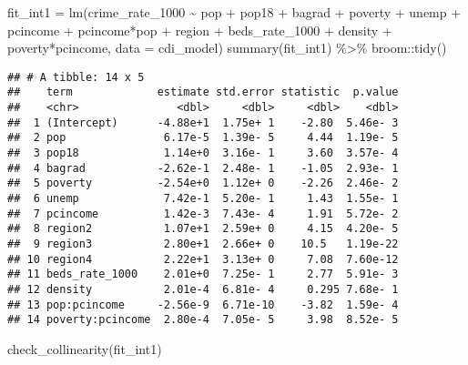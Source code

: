 \documentclass[
  11pt,
]{article}
\newenvironment{Shaded}{\begin{snugshade}}{\end{snugshade}}
\newcommand{\AttributeTok}[1]{\textcolor[rgb]{0.77,0.63,0.00}{#1}}
\newcommand{\FunctionTok}[1]{\textcolor[rgb]{0.00,0.00,0.00}{#1}}
\newcommand{\NormalTok}[1]{#1}
\newcommand{\OtherTok}[1]{\textcolor[rgb]{0.56,0.35,0.01}{#1}}
\newcommand{\SpecialCharTok}[1]{\textcolor[rgb]{0.00,0.00,0.00}{#1}}
\begin{document}
\begin{Shaded}
\begin{Highlighting}[]
\NormalTok{fit\_int1 }\OtherTok{=} \FunctionTok{lm}\NormalTok{(crime\_rate\_1000 }\SpecialCharTok{\textasciitilde{}}  
\NormalTok{                   pop }\SpecialCharTok{+}\NormalTok{ pop18 }\SpecialCharTok{+}\NormalTok{ bagrad }\SpecialCharTok{+}
\NormalTok{                  poverty }\SpecialCharTok{+}\NormalTok{ unemp }\SpecialCharTok{+}\NormalTok{ pcincome }\SpecialCharTok{+}\NormalTok{ pcincome}\SpecialCharTok{*}\NormalTok{pop }\SpecialCharTok{+}\NormalTok{ region }\SpecialCharTok{+}
\NormalTok{                  beds\_rate\_1000 }\SpecialCharTok{+}\NormalTok{ density }\SpecialCharTok{+}
\NormalTok{                  poverty}\SpecialCharTok{*}\NormalTok{pcincome, }\AttributeTok{data =}\NormalTok{ cdi\_model)}
\FunctionTok{summary}\NormalTok{(fit\_int1) }\SpecialCharTok{\%\textgreater{}\%}\NormalTok{ broom}\SpecialCharTok{::}\FunctionTok{tidy}\NormalTok{()}
\end{Highlighting}
\end{Shaded}

\begin{verbatim}
## # A tibble: 14 x 5
##    term             estimate std.error statistic  p.value
##    <chr>               <dbl>     <dbl>     <dbl>    <dbl>
##  1 (Intercept)      -4.88e+1  1.75e+ 1    -2.80  5.46e- 3
##  2 pop               6.17e-5  1.39e- 5     4.44  1.19e- 5
##  3 pop18             1.14e+0  3.16e- 1     3.60  3.57e- 4
##  4 bagrad           -2.62e-1  2.48e- 1    -1.05  2.93e- 1
##  5 poverty          -2.54e+0  1.12e+ 0    -2.26  2.46e- 2
##  6 unemp             7.42e-1  5.20e- 1     1.43  1.55e- 1
##  7 pcincome          1.42e-3  7.43e- 4     1.91  5.72e- 2
##  8 region2           1.07e+1  2.59e+ 0     4.15  4.20e- 5
##  9 region3           2.80e+1  2.66e+ 0    10.5   1.19e-22
## 10 region4           2.22e+1  3.13e+ 0     7.08  7.60e-12
## 11 beds_rate_1000    2.01e+0  7.25e- 1     2.77  5.91e- 3
## 12 density           2.01e-4  6.81e- 4     0.295 7.68e- 1
## 13 pop:pcincome     -2.56e-9  6.71e-10    -3.82  1.59e- 4
## 14 poverty:pcincome  2.80e-4  7.05e- 5     3.98  8.52e- 5
\end{verbatim}

\begin{Shaded}
\begin{Highlighting}[]
\FunctionTok{check\_collinearity}\NormalTok{(fit\_int1)}
\end{Highlighting}
\end{Shaded}
\end{document}
